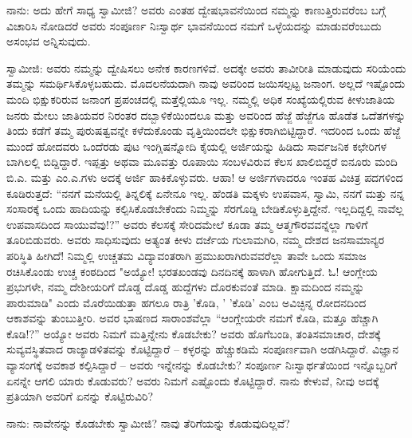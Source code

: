 ನಾನು: ಅದು ಹೇಗೆ ಸಾಧ್ಯ ಸ್ವಾಮೀಜಿ? ಅವರು ಎಂತಹ ದ್ವೇಷಭಾವನೆಯಿಂದ ನಮ್ಮನ್ನು ಕಾಣುತ್ತಿರುವರೆಂಬ ಬಗ್ಗೆ ವಿಚಾರಿಸಿ ನೋಡಿದರೆ ಅವರು ಸಂಪೂರ್ಣ ನಿಃಸ್ವಾರ್ಥ ಭಾವನೆಯಿಂದ ನಮಗೆ ಒಳ್ಳೆಯದನ್ನು ಮಾಡುವರೆಂಬುದು ಅಸಂಭವ ಅನ್ನಿಸುವುದು.

ಸ್ವಾಮೀಜಿ: ಅವರು ನಮ್ಮನ್ನು ದ್ವೇಷಿಸಲು ಅನೇಕ ಕಾರಣಗಳಿವೆ. ಅದಕ್ಕೇ ಅವರು ತಾವೀರೀತಿ ಮಾಡುವುದು ಸರಿಯೆಂದು ತಮ್ಮನ್ನು ಸಮರ್ಥಿಸಿಕೊಳ್ಳಬಹುದು. ಮೊದಲನೆಯದಾಗಿ ನಾವು ಅವರಿಂದ ಜಯಿಸಲ್ಪಟ್ಟ ಜನಾಂಗ. ಅಲ್ಲದೆ ಇಷ್ಟೊಂದು ಮಂದಿ ಭಿಕ್ಷುಕರಿರುವ ಜನಾಂಗ ಪ್ರಪಂಚದಲ್ಲಿ ಮತ್ತೆಲ್ಲಿಯೂ ಇಲ್ಲ. ನಮ್ಮಲ್ಲಿ ಅಧಿಕ ಸಂಖ್ಯೆಯಲ್ಲಿರುವ ಕೀಳುಜಾತಿಯ ಜನರು ಮೇಲು ಜಾತಿಯವರ ನಿರಂತರ ದಬ್ಬಾಳಿಕೆಯಿಂದಲೂ ಮತ್ತು ಅವರಿಂದ ಹೆಜ್ಜೆ ಹೆಜ್ಜೆಗೂ ಹೊಡೆತ ಒದೆತಗಳನ್ನು ತಿಂದು ಕಡೆಗೆ ತಮ್ಮ ಪುರುಷತ್ವವನ್ನೇ ಕಳೆದುಕೊಂಡು ವೃತ್ತಿಯಿಂದಲೇ ಭಿಕ್ಷುಕರಾಗಿಬಿಟ್ಟಿದ್ದಾರೆ. ಇದರಿಂದ ಒಂದು ಹೆಜ್ಜೆ ಮುಂದೆ ಹೋದವರು ಒಂದೆರಡು ಪುಟ ಇಂಗ್ಲಿಷನ್ನೋದಿ ಕೈಯಲ್ಲಿ ಅರ್ಜಿಯನ್ನು ಹಿಡಿದು ಸಾರ್ವಜನಿಕ ಕಛೇರಿಗಳ ಬಾಗಿಲಲ್ಲಿ ಬಿದ್ದಿದ್ದಾರೆ. ಇಪ್ಪತ್ತು ಅಥವಾ ಮೂವತ್ತು ರೂಪಾಯಿ ಸಂಬಳವಿರುವ ಕೆಲಸ ಖಾಲಿಬಿದ್ದರೆ ಐನೂರು ಮಂದಿ ಬಿ.ಎ. ಮತ್ತು ಎಂ.ಎ.ಗಳು ಅದಕ್ಕೆ ಅರ್ಜಿ ಹಾಕಿಕೊಳ್ಳುವರು. ಆಹಾ! ಆ ಅರ್ಜಿಗಳಾದರೂ ಇಂತಹ ವಿಚಿತ್ರ ಪದಗಳಿಂದ ಕೂಡಿರುತ್ತದೆ: “ನನಗೆ ಮನೆಯಲ್ಲಿ ತಿನ್ನಲಿಕ್ಕೆ ಏನೇನೂ ಇಲ್ಲ. ಹೆಂಡತಿ ಮಕ್ಕಳು ಉಪವಾಸ, ಸ್ವಾಮಿ, ನನಗೆ ಮತ್ತು ನನ್ನ ಸಂಸಾರಕ್ಕೆ ಒಂದು ಹಾದಿಯನ್ನು ಕಲ್ಪಿಸಿಕೊಡಬೇಕೆಂದು ನಿಮ್ಮನ್ನು ಸೆರಗೊಡ್ಡಿ ಬೇಡಿಕೊಳ್ಳುತ್ತಿದ್ದೇನೆ. ಇಲ್ಲದಿದ್ದಲ್ಲಿ ನಾವೆಲ್ಲ ಉಪವಾಸದಿಂದ ಸಾಯುವೆವು!?” ಅವರು ಕೆಲಸಕ್ಕೆ ಸೇರಿದಮೇಲೆ ಕೂಡಾ ತಮ್ಮ ಆತ್ಮಗೌರವವನ್ನೆಲ್ಲಾ ಗಾಳಿಗೆ ತೂರಿಬಿಡುವರು. ಅವರು ಸಾಧಿಸುವುದು ಅತ್ಯಂತ ಕೀಳು ದರ್ಜೆಯ ಗುಲಾಮಗಿರಿ, ನಮ್ಮ ದೇಶದ ಜನಸಾಮಾನ್ಯರ ಪರಿಸ್ಥಿತಿ ಹೀಗಿದೆ! ನಿಮ್ಮಲ್ಲಿ ಉಚ್ಚತಮ ವಿದ್ಯಾವಂತರಾಗಿ ಪ್ರಮುಖರಾಗಿರುವವರೆಲ್ಲಾ ತಾವೇ ಒಂದು ಸಮಾಜ ರಚಿಸಿಕೊಂಡು ಉಚ್ಚ ಕಂಠದಿಂದ "ಅಯ್ಯೋ! ಭರತಖಂಡವು ದಿನದಿನಕ್ಕೆ ಹಾಳಾಗಿ ಹೋಗುತ್ತಿದೆ. ಓ! ಆಂಗ್ಲೇಯ ಪ್ರಭುಗಳೇ, ನಮ್ಮ ದೇಶೀಯರಿಗೆ ದೊಡ್ಡ ದೊಡ್ಡ ಹುದ್ದೆಗಳು ದೊರಕುವಂತೆ ಮಾಡಿ. ಕ್ಷಾಮದಿಂದ ನಮ್ಮನ್ನು ಪಾರುಮಾಡಿ" ಎಂದು ಮೊರೆಯಿಡುತ್ತಾ ಹಗಲೂ ರಾತ್ರಿ 'ಕೊಡಿ, ' 'ಕೊಡಿ' ಎಂಬ ಅವಿಚ್ಛಿನ್ನ ರೋದನದಿಂದ ಆಕಾಶವನ್ನು ತುಂಬುತ್ತೀರಿ. ಅವರ ಭಾಷಣದ ಸಾರಾಂಶವೆಲ್ಲಾ “ಆಂಗ್ಲೇಯರೇ ನಮಗೆ ಕೊಡಿ, ಮತ್ತೂ ಹೆಚ್ಚಾಗಿ ಕೊಡಿ!?” ಅಯ್ಯೋ ಅವರು ನಿಮಗೆ ಮತ್ತಿನ್ನೇನು ಕೊಡಬೇಕು? ಅವರು ಹೊಗೆಬಂಡಿ, ತಂತಿಸಮಾಚಾರ, ದೇಶಕ್ಕೆ ಸುವ್ಯವಸ್ಥಿತವಾದ ರಾಜ್ಯಾಡಳಿತವನ್ನು ಕೊಟ್ಟಿದ್ದಾರೆ – ಕಳ್ಳರನ್ನು ಹೆಚ್ಚುಕಡಿಮೆ ಸಂಪೂರ್ಣವಾಗಿ ಅಡಗಿಸಿದ್ದಾರೆ. ವಿಜ್ಞಾನ ವ್ಯಾಸಂಗಕ್ಕೆ ಅವಕಾಶ ಕಲ್ಪಿಸಿದ್ದಾರೆ – ಅವರು ಇನ್ನೇನನ್ನು ಕೊಡಬೇಕು? ಸಂಪೂರ್ಣ ನಿಃಸ್ವಾರ್ಥತೆಯಿಂದ ಇನ್ನೊಬ್ಬರಿಗೆ ಏನನ್ನೇ ಆಗಲಿ ಯಾರು ಕೊಡುವರು? ಅವರು ನಿಮಗೆ ಎಷ್ಟೊಂದು ಕೊಟ್ಟಿದ್ದಾರೆ. ನಾನು ಕೇಳುವೆ, ನೀವು ಅದಕ್ಕೆ ಪ್ರತಿಯಾಗಿ ಅವರಿಗೆ ಏನನ್ನು ಕೊಟ್ಟಿರುವಿರಿ?

ನಾನು: ನಾವೇನನ್ನು ಕೊಡಬೇಕು ಸ್ವಾಮೀಜಿ? ನಾವು ತೆರಿಗೆಯನ್ನು ಕೊಡುವುದಿಲ್ಲವೆ?

